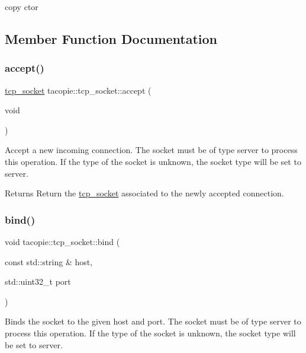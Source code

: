 copy ctor 



\subsection{Member Function Documentation}
\mbox{\label{classtacopie_1_1tcp__socket_af5113c9332f83643cdaaf15c3f137760}} 
\subsubsection{\texorpdfstring{accept()}{accept()}}
{\footnotesize\ttfamily \hyperlink{classtacopie_1_1tcp__socket}{tcp\+\_\+socket} tacopie\+::tcp\+\_\+socket\+::accept (\begin{DoxyParamCaption}\item[{void}]{ }\end{DoxyParamCaption})}

Accept a new incoming connection. The socket must be of type server to process this operation. If the type of the socket is unknown, the socket type will be set to server.

\begin{DoxyReturn}{Returns}
Return the \hyperlink{classtacopie_1_1tcp__socket}{tcp\+\_\+socket} associated to the newly accepted connection. 
\end{DoxyReturn}
\mbox{\label{classtacopie_1_1tcp__socket_a910a183d7c45483f1cdacd10a1896155}} 
\subsubsection{\texorpdfstring{bind()}{bind()}}
{\footnotesize\ttfamily void tacopie\+::tcp\+\_\+socket\+::bind (\begin{DoxyParamCaption}\item[{const std\+::string \&}]{host,  }\item[{std\+::uint32\+\_\+t}]{port }\end{DoxyParamCaption})}

Binds the socket to the given host and port. The socket must be of type server to process this operation. If the type of the socket is unknown, the socket type will be set to server.


